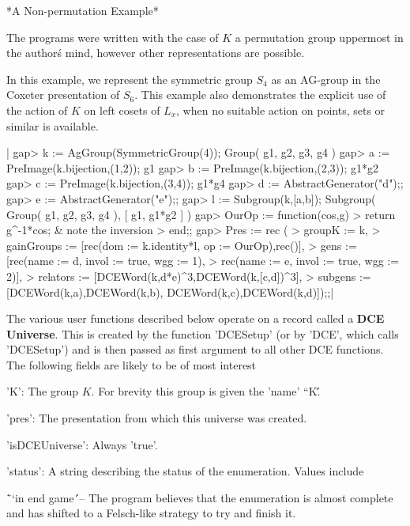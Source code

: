 \vspace{5mm}
*A Non-permutation Example*

The programs were   written with the   case  of $K$ a  permutation  group
uppermost  in the  author\'s  mind,   however other representations   are
possible.

In this example, we represent the symmetric group $S_4$ as an AG-group in
the Coxeter  presentation of  $S_6$. This  example  also demonstrates the
explicit  use  of the  action of  $K$  on left cosets  of  $L_x$, when no
suitable action on points, sets or similar is available.

|    gap> k := AgGroup(SymmetricGroup(4));
    Group( g1, g2, g3, g4 )
    gap> a := PreImage(k.bijection,(1,2));
    g1
    gap> b := PreImage(k.bijection,(2,3));
    g1*g2
    gap> c := PreImage(k.bijection,(3,4));
    g1*g4
    gap> d := AbstractGenerator("d");;
    gap> e := AbstractGenerator("e");;
    gap> l := Subgroup(k,[a,b]);
    Subgroup( Group( g1, g2, g3, g4 ), [ g1, g1*g2 ] )
    gap> OurOp := function(cos,g)
    >     return g^-1*cos;                   & note the inversion
    > end;;
    gap> Pres := rec (
    >    groupK := k,
    >    gainGroups := [rec(dom := k.identity*l, op := OurOp),rec()],
    >    gens := [rec(name := d, invol := true, wgg := 1),
    >             rec(name := e, invol := true, wgg := 2)],
    >    relators := [DCEWord(k,d*e)^3,DCEWord(k,[c,d])^3],
    >    subgens := [DCEWord(k,a),DCEWord(k,b), DCEWord(k,c),DCEWord(k,d)]);;|


The various user  functions described below operate  on a record called a
{\bf  DCE Universe}. This is  created by the  function  'DCESetup' (or by
'DCE', which calls  'DCESetup') and is then  passed as first argument  to
all other DCE functions.  The following fields  are likely to be of  most
interest\:

'K': The group $K$.  For brevity this group is given the 'name' ``K\'\'.

'pres': The presentation from which this universe was created.

'isDCEUniverse': Always 'true'.

'status': A string describing   the  status of the  enumeration.   Values
include\:

\= ``in end game\'\'\ -- The  program  believes  that the  enumeration is
almost complete and  has  shifted to a Felsch-like  strategy  to  try and
finish it.

